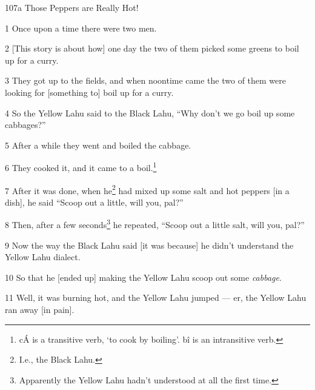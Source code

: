 
107a Those Peppers are Really Hot!

1 Once upon a time there were two men.

2 [This story is about how] one day the two of them picked some greens to boil
up for a curry.

3 They got up to the fields, and when noontime came the two of them were looking
for [something to] boil up for a curry.

4 So the Yellow Lahu said to the Black Lahu, ``Why don't we go boil up some cabbages?''

5 After a while they went and boiled the cabbage.

6 They cooked it, and it came to a boil.\footnote{cÁ is a transitive verb, `to cook by boiling'. bî is an intransitive verb.}

7 After it was done, when he\footnote{I.e., the Black Lahu.} had mixed up some salt and hot peppers [in a dish],
he said ``Scoop out a little, will you, pal?''

8 Then, after a few seconds\footnote{Apparently the Yellow Lahu hadn't understood at all the first time.} he repeated, ``Scoop out a little salt, will you,
pal?''

9 Now the way the Black Lahu said [it was because] he didn't understand the Yellow
Lahu dialect.

10 So that he [ended up] making the Yellow Lahu scoop out some \textit{cabbage}.

11 Well, it was burning hot, and the Yellow Lahu jumped --- er, the Yellow Lahu
ran away [in pain].

